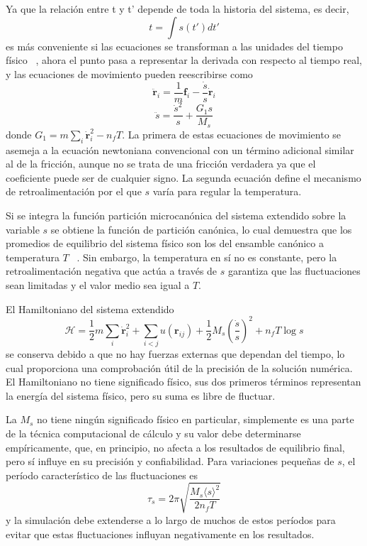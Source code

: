 Ya que la relación entre t y t' depende de toda la historia del sistema, es decir,
$$
t = \int s(t') dt'
$$
es más conveniente si las ecuaciones se transforman a las unidades del tiempo
físico ~\cite{nose1984b, hoover1985}, ahora el punto pasa a representar la 
derivada con respecto al tiempo real, y las ecuaciones de movimiento pueden 
reescribirse como
$$
\ddot{\mathbf{r}}_i = \frac{1}{m} \mathbf{f}_i - \frac{\dot{s}}{s} \dot{\mathbf{r}}_i
$$
$$
\ddot{s} = \frac{\dot{s}^2}{s} + \frac{G_1 s}{M_s} 
$$
donde $G_1 = m \sum_i \dot{\mathbf{r}}_i^2 - n_f T$. La primera de estas 
ecuaciones de movimiento se asemeja a la ecuación newtoniana convencional con un 
término adicional similar al de la fricción, aunque no se trata de una fricción 
verdadera ya que el coeficiente puede ser de cualquier signo. La segunda ecuación 
define el mecanismo de retroalimentación por el que $s$ varía para regular la 
temperatura.

Si se integra la función partición microcanónica del sistema extendido sobre la
variable $s$ se obtiene la función de partición canónica, lo cual demuestra que
los promedios de equilibrio del sistema físico son los del ensamble canónico a
temperatura $T$ ~\cite{nose1984a}. Sin embargo, la temperatura en sí no es 
constante, pero la retroalimentación negativa que actúa a través de $s$ garantiza
que las fluctuaciones sean limitadas y el valor medio sea igual a $T$.

El Hamiltoniano del sistema extendido
$$
\mathcal{H} = \frac{1}{2} m \sum_i \dot{\mathbf{r}}_i^2 + \sum_{i<j} u(\mathbf{r}_{ij}) + \frac{1}{2} M_s \left(\frac{\dot{s}}{s}\right)^2 + n_f T \log s
$$
se conserva debido a que no hay fuerzas externas que dependan del tiempo, lo cual 
proporciona una comprobación útil de la precisión de la solución numérica. El 
Hamiltoniano no tiene significado físico, sus dos primeros términos representan 
la energía del sistema físico, pero su suma es libre de fluctuar.

La $M_s$ no tiene ningún significado físico en particular, simplemente es una 
parte de la técnica computacional de cálculo y su valor debe determinarse 
empíricamente, que, en principio, no afecta a los resultados de equilibrio final, 
pero sí influye en su precisión y confiabilidad. Para variaciones pequeñas de $s$, 
el período característico de las fluctuaciones es ~\cite{nose1984a}
$$
\tau_s = 2 \pi \sqrt{\frac{M_s \langle s \rangle^2}{2 n_f T}}
$$
y la simulación debe extenderse a lo largo de muchos de estos períodos para evitar 
que estas fluctuaciones influyan negativamente en los resultados.

